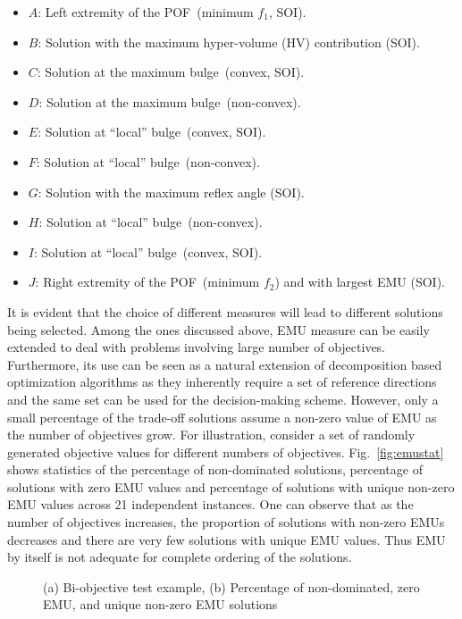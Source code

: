 \begin{itemize}
	\setlength\itemsep{0em}
	\item $A$: Left extremity of the POF~(minimum $f_1$, SOI).
	\item $B$: Solution with the maximum hyper-volume (HV) contribution (SOI). 
	\item $C$: Solution at the maximum bulge~(convex, SOI).
	\item $D$: Solution at the maximum bulge~(non-convex).
	\item $E$: Solution at ``local'' bulge~(convex, SOI).
	\item $F$: Solution at ``local'' bulge~(non-convex).
	\item $G$: Solution with the maximum reflex angle (SOI).
	\item $H$: Solution at ``local'' bulge~(non-convex).
	\item $I$:  Solution at ``local'' bulge~(convex, SOI).
	\item $J$: Right extremity of the POF~(minimum $f_2$) and with largest EMU (SOI). 
\end{itemize}

It is evident that the choice of different measures will lead to different solutions being selected. Among the ones discussed above, EMU measure can be easily extended to deal with problems involving large number of objectives. Furthermore, its use can be seen as a natural extension of decomposition based optimization algorithms as they inherently require a set of reference directions and the same set can be used for the decision-making scheme. However, only a small percentage of the trade-off solutions assume a non-zero value of EMU as the number of objectives grow. For illustration, consider a set of randomly generated objective values for different numbers of objectives. Fig.~\ref{fig:emustat} shows statistics of the percentage of non-dominated solutions, percentage of solutions with zero EMU values and percentage of solutions with unique non-zero EMU values across 21 independent instances. One can observe that as the number of objectives increases, the proportion of solutions with non-zero EMUs decreases and there are very few solutions with unique EMU values. Thus EMU by itself is not adequate for complete ordering of the solutions.

\begin{figure*}[!htb]
	\centering    
	\quad
	\quad     
	\caption{(a) Bi-objective test example, (b) Percentage of non-dominated, zero EMU, and unique non-zero EMU solutions}
	\label{fig:testprop}
\end{figure*}

